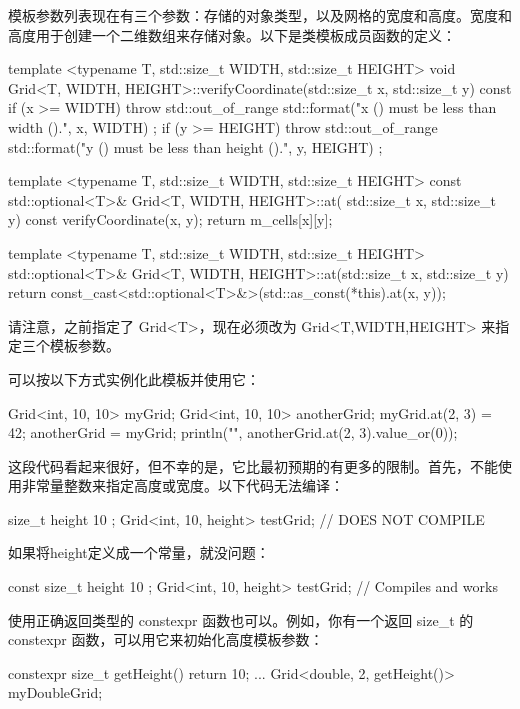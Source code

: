 模板参数列表现在有三个参数：存储的对象类型，以及网格的宽度和高度。宽度和高度用于创建一个二维数组来存储对象。以下是类模板成员函数的定义：

\begin{cpp}
template <typename T, std::size_t WIDTH, std::size_t HEIGHT>
void Grid<T, WIDTH, HEIGHT>::verifyCoordinate(std::size_t x, std::size_t y) const
{
    if (x >= WIDTH) {
        throw std::out_of_range {
            std::format("x ({}) must be less than width ({}).", x, WIDTH) };
    }
    if (y >= HEIGHT) {
        throw std::out_of_range {
            std::format("y ({}) must be less than height ({}).", y, HEIGHT) };
    }
}

template <typename T, std::size_t WIDTH, std::size_t HEIGHT>
const std::optional<T>& Grid<T, WIDTH, HEIGHT>::at(
    std::size_t x, std::size_t y) const
{
    verifyCoordinate(x, y);
    return m_cells[x][y];
}

template <typename T, std::size_t WIDTH, std::size_t HEIGHT>
std::optional<T>& Grid<T, WIDTH, HEIGHT>::at(std::size_t x, std::size_t y)
{
    return const_cast<std::optional<T>&>(std::as_const(*this).at(x, y));
}
\end{cpp}

请注意，之前指定了 Grid<T>，现在必须改为 Grid<T,WIDTH,HEIGHT> 来指定三个模板参数。

可以按以下方式实例化此模板并使用它：

\begin{cpp}
Grid<int, 10, 10> myGrid;
Grid<int, 10, 10> anotherGrid;
myGrid.at(2, 3) = 42;
anotherGrid = myGrid;
println("{}", anotherGrid.at(2, 3).value_or(0));
\end{cpp}

这段代码看起来很好，但不幸的是，它比最初预期的有更多的限制。首先，不能使用非常量整数来指定高度或宽度。以下代码无法编译：

\begin{cpp}
size_t height { 10 };
Grid<int, 10, height> testGrid; // DOES NOT COMPILE
\end{cpp}

如果将height定义成一个常量，就没问题：

\begin{cpp}
const size_t height { 10 };
Grid<int, 10, height> testGrid; // Compiles and works
\end{cpp}

使用正确返回类型的 constexpr 函数也可以。例如，你有一个返回 size\_t 的 constexpr 函数，可以用它来初始化高度模板参数：

\begin{cpp}
constexpr size_t getHeight() { return 10; }
...
Grid<double, 2, getHeight()> myDoubleGrid;
\end{cpp}

